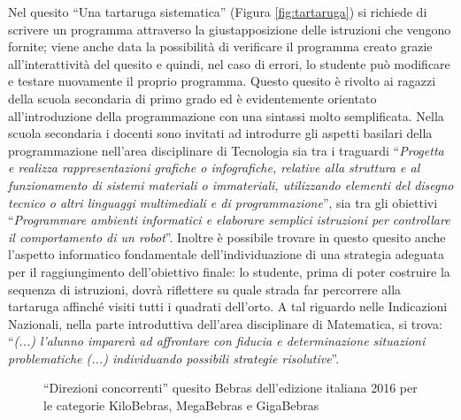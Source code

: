 \documentclass[12pt]{report}
\begin{document}
Nel quesito ``Una tartaruga sistematica'' (Figura \ref{fig:tartaruga}) si richiede di scrivere un programma attraverso la giustapposizione delle istruzioni che vengono fornite; viene anche data la possibilità di verificare il programma creato grazie all'interattività del 	quesito e quindi, nel caso di errori, lo studente può modificare e testare nuovamente il proprio programma. Questo quesito è rivolto ai ragazzi della scuola secondaria di primo grado ed è evidentemente orientato all'introduzione della programmazione con una sintassi molto semplificata. Nella scuola secondaria i docenti sono invitati ad introdurre gli aspetti basilari della programmazione nell'area disciplinare di Tecnologia sia tra i traguardi ``\textit{Progetta e realizza rappresentazioni grafiche o infografiche, relative alla struttura e al funzionamento di sistemi materiali o immateriali, utilizzando elementi del disegno tecnico o altri linguaggi multimediali e di programmazione}'', sia tra gli obiettivi ``\textit{Programmare ambienti informatici e elaborare semplici istruzioni per controllare il comportamento di un robot}''.
Inoltre è possibile trovare in questo quesito anche l'aspetto informatico fondamentale dell'individuazione di una strategia adeguata per il raggiungimento dell'obiettivo finale: lo studente, prima di poter costruire la sequenza di istruzioni, dovrà riflettere su quale strada far percorrere alla tartaruga affinché visiti tutti i quadrati dell'orto. A tal riguardo nelle Indicazioni Nazionali, nella parte introduttiva dell'area disciplinare di Matematica, si trova: ``\textit{(...) l’alunno imparerà ad affrontare con fiducia e determinazione situazioni problematiche (...) individuando possibili strategie risolutive}''.


\bigskip
\begin{figure}[h]
	\centering
	\caption{``Direzioni concorrenti'' quesito Bebras dell'edizione italiana 2016 per le categorie KiloBebras, MegaBebras e GigaBebras}\label{fig:direzioni}
\end{figure}
\end{document}
